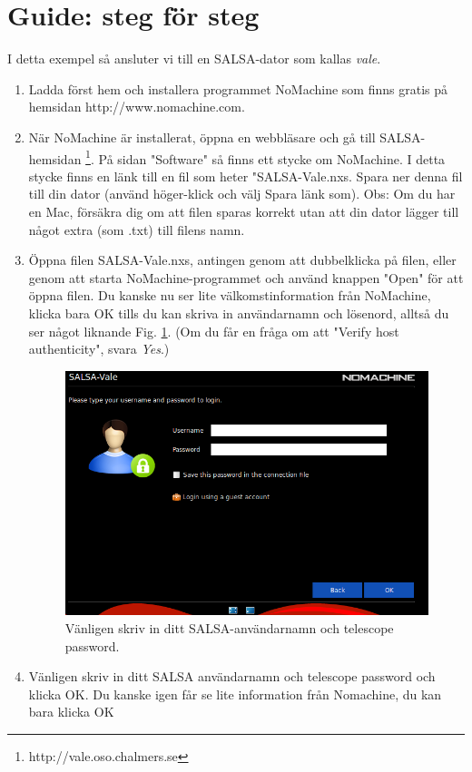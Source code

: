 \section{Guide: steg för steg}
I detta exempel så ansluter vi till en SALSA-dator som kallas \emph{vale}.
\begin{enumerate}
	\item Ladda först hem och installera programmet NoMachine som finns gratis
		på hemsidan http://www.nomachine.com. 
\item När NoMachine är installerat, öppna en webbläsare och gå till 
	SALSA-hemsidan \footnote{http://vale.oso.chalmers.se}. På sidan "Software" så finns ett stycke om 
	NoMachine. I detta stycke finns en länk till en fil som heter "SALSA-Vale.nxs.
	Spara ner denna fil till din dator (använd höger-klick och välj Spara länk som).
	Obs: Om du har en Mac, försäkra dig om att filen sparas korrekt utan att 
	din dator lägger till något extra (som .txt) till filens namn.
\item Öppna filen SALSA-Vale.nxs, antingen genom att dubbelklicka på filen, eller genom
	att starta NoMachine-programmet och använd knappen "Open" för att öppna filen. 
	Du kanske nu ser lite välkomstinformation från NoMachine, klicka bara OK tills du
	kan skriva in användarnamn och lösenord, alltså du ser något liknande Fig. 
	\ref{fig:login}. (Om du får en fråga om att "Verify host authenticity", svara 
	\emph{Yes}.)
\begin{figure}[H]
    \centering
    \includegraphics[height=0.5\textwidth]{../figures/nomachinefigs/SALSA_login.png}
    \caption{Vänligen skriv in ditt SALSA-användarnamn och telescope password.}
    \label{fig:login}
\end{figure}
\item Vänligen skriv in ditt SALSA användarnamn och telescope password och klicka OK. 
	Du kanske igen får se lite information från Nomachine, du kan bara klicka OK

\end{enumerate}
